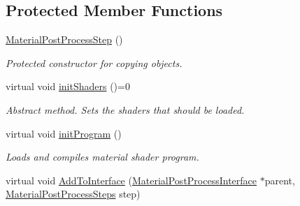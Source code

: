 \subsection*{Protected Member Functions}
\begin{DoxyCompactItemize}
\item 
\mbox{\label{class_geometry_engine_1_1_custom_shading_1_1_material_post_process_step_a94078483821ee49460fb1ff931bb0eb9}} 
\mbox{\hyperlink{class_geometry_engine_1_1_custom_shading_1_1_material_post_process_step_a94078483821ee49460fb1ff931bb0eb9}{Material\+Post\+Process\+Step}} ()
\begin{DoxyCompactList}\small\item\em Protected constructor for copying objects. \end{DoxyCompactList}\item 
\mbox{\label{class_geometry_engine_1_1_custom_shading_1_1_material_post_process_step_a3b20b03a93292a936be652a58810ac94}} 
virtual void \mbox{\hyperlink{class_geometry_engine_1_1_custom_shading_1_1_material_post_process_step_a3b20b03a93292a936be652a58810ac94}{init\+Shaders}} ()=0
\begin{DoxyCompactList}\small\item\em Abstract method. Sets the shaders that should be loaded. \end{DoxyCompactList}\item 
\mbox{\label{class_geometry_engine_1_1_custom_shading_1_1_material_post_process_step_a69d7f5556cd8038ae234f8904e61f043}} 
virtual void \mbox{\hyperlink{class_geometry_engine_1_1_custom_shading_1_1_material_post_process_step_a69d7f5556cd8038ae234f8904e61f043}{init\+Program}} ()
\begin{DoxyCompactList}\small\item\em Loads and compiles material shader program. \end{DoxyCompactList}\item 
virtual void \mbox{\hyperlink{class_geometry_engine_1_1_custom_shading_1_1_material_post_process_step_a8e8bb9fcc0f9f40f599ecfda35d4fe16}{Add\+To\+Interface}} (\mbox{\hyperlink{class_geometry_engine_1_1_custom_shading_1_1_material_post_process_interface}{Material\+Post\+Process\+Interface}} $\ast$parent, \mbox{\hyperlink{namespace_geometry_engine_1_1_custom_shading_af8b09b91ca7086f4f67a5d4181f35e58}{Material\+Post\+Process\+Steps}} step)

\end{DoxyCompactItemize}
